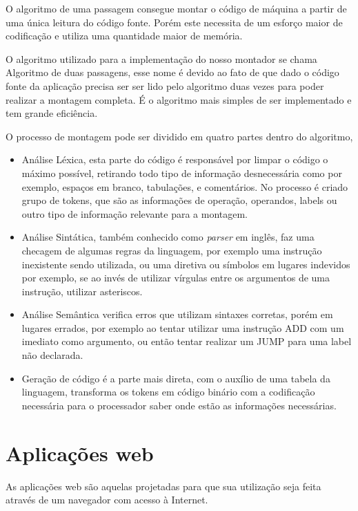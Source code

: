 		O algoritmo de uma passagem consegue montar o código de máquina a partir de uma única leitura do código fonte. Porém este necessita de um esforço maior de codificação e utiliza uma quantidade maior de memória.

		O algoritmo utilizado para a implementação do nosso montador se chama Algoritmo de duas passagens, esse nome é devido ao fato de que dado o código fonte da aplicação precisa ser ser lido pelo algoritmo duas vezes para poder realizar a montagem completa. É o algoritmo mais simples de ser implementado e tem grande eficiência.

		O processo de montagem pode ser dividido em quatro partes dentro do algoritmo,

		\begin{itemize}
			\item Análise Léxica, esta parte do código é responsável por limpar o código o máximo possível, retirando todo tipo de informação desnecessária como por exemplo, espaços em branco, tabulações, e comentários. No processo é criado grupo de tokens, que são as informações de operação, operandos, labels ou outro tipo de informação relevante para a montagem.
			\item Análise Sintática, também conhecido como \textit{parser} em inglês, faz uma checagem de algumas regras da linguagem, por exemplo uma instrução inexistente sendo utilizada, ou uma diretiva ou símbolos em lugares indevidos por exemplo, se ao invés de utilizar vírgulas entre os argumentos de uma instrução, utilizar asteriscos.
			\item Análise Semântica verifica erros que utilizam sintaxes corretas, porém em lugares errados, por exemplo ao tentar utilizar uma instrução ADD com um imediato como argumento, ou então tentar realizar um JUMP para uma label não declarada. 
			\item Geração de código é a parte mais direta, com o auxílio de uma tabela da linguagem, transforma os tokens em código binário com a codificação necessária para o processador saber onde estão as informações necessárias.
		\end{itemize} 


\section{Aplicações web}

	As aplicações web são aquelas projetadas para que sua utilização seja feita através de um navegador com acesso à Internet.


